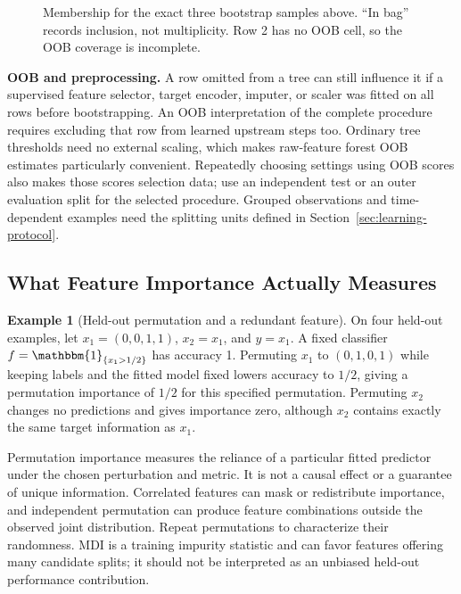 \documentclass[11pt,twoside]{article}
\numberwithin{equation}{section}
\newcommand{\indicator}[1]{\mathbbm{1}_{\{#1\}}}
\theoremstyle{plain}
\theoremstyle{definition}
\newtheorem{example}[theorem]{Example}
\theoremstyle{remark}
\begin{document}
\begin{figure}[H]
\centering
{}
\caption{Membership for the exact three bootstrap samples above. ``In bag'' records inclusion, not multiplicity. Row 2 has no OOB cell, so the OOB coverage is incomplete.}
\end{figure}

\textbf{OOB and preprocessing.} A row omitted from a tree can still influence it if a supervised feature selector, target encoder, imputer, or scaler was fitted on all rows before bootstrapping. An OOB interpretation of the complete procedure requires excluding that row from learned upstream steps too. Ordinary tree thresholds need no external scaling, which makes raw-feature forest OOB estimates particularly convenient. Repeatedly choosing settings using OOB scores also makes those scores selection data; use an independent test or an outer evaluation split for the selected procedure. Grouped observations and time-dependent examples need the splitting units defined in Section~\ref{sec:learning-protocol}.

\subsection{What Feature Importance Actually Measures}
\begin{example}[Held-out permutation and a redundant feature]
On four held-out examples, let $x_1=(0,0,1,1)$, $x_2=x_1$, and $y=x_1$. A fixed classifier $f=\indicator{x_1>1/2}$ has accuracy 1. Permuting $x_1$ to $(0,1,0,1)$ while keeping labels and the fitted model fixed lowers accuracy to $1/2$, giving a permutation importance of $1/2$ for this specified permutation. Permuting $x_2$ changes no predictions and gives importance zero, although $x_2$ contains exactly the same target information as $x_1$.
\end{example}
Permutation importance measures the reliance of a particular fitted predictor under the chosen perturbation and metric. It is not a causal effect or a guarantee of unique information. Correlated features can mask or redistribute importance, and independent permutation can produce feature combinations outside the observed joint distribution. Repeat permutations to characterize their randomness. MDI is a training impurity statistic and can favor features offering many candidate splits; it should not be interpreted as an unbiased held-out performance contribution.
\end{document}
